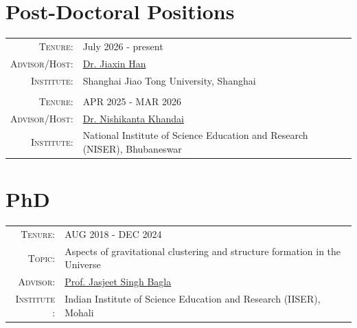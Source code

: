 \documentclass[a4paper,10pt]{article}
\begin{document}
\section{Post-Doctoral Positions}
\begin{tabular}{rl}
    \textsc{Tenure:} & July 2026 - present \\
    \textsc{Advisor/Host:}   & \href{https://gax.sjtu.edu.cn/jxhan/node/4}{Dr. Jiaxin Han} \\
    \textsc{Institute:}     & Shanghai Jiao Tong University, Shanghai\\ \\

    \textsc{Tenure:} & APR 2025 - MAR 2026 \\
    \textsc{Advisor/Host:}   & \href{https://niser.irins.org/profile/241972}{Dr. Nishikanta Khandai} \\
    \textsc{Institute:}     & National Institute of Science Education and Research (NISER), Bhubaneswar\\
\end{tabular}


\section{PhD}

\begin{tabular}{rl}
    \textsc{Tenure:} & AUG 2018 - DEC 2024 \\
    \textsc{Topic:} & Aspects of gravitational clustering and structure formation in the Universe \\
    \textsc{Advisor:}   & \href{https://web.iisermohali.ac.in/Faculty/jasjeet/index.html}{Prof. Jasjeet Singh Bagla}
    \\
    \textsc{Institute :}     & Indian Institute of Science Education and Research (IISER), Mohali\\
\end{tabular}

\end{document}
